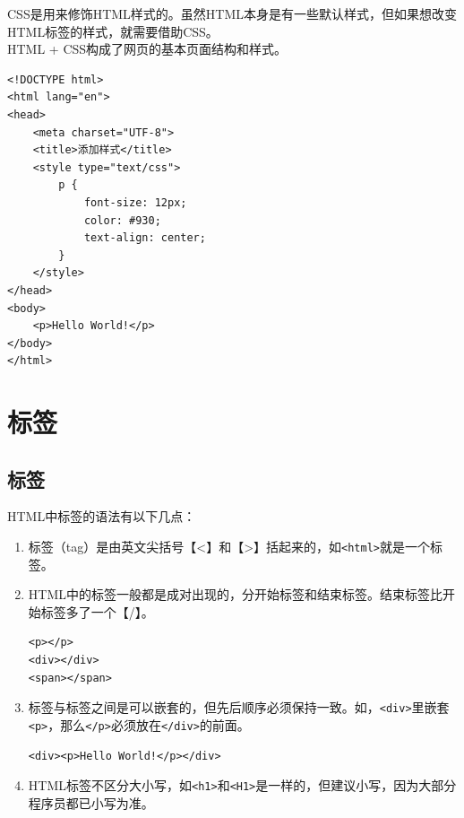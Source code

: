 CSS是用来修饰HTML样式的。虽然HTML本身是有一些默认样式，但如果想改变HTML标签的样式，就需要借助CSS。 \\

HTML + CSS构成了网页的基本页面结构和样式。

\begin{lstlisting}[style=htmlcssjs, title=添加样式]
<!DOCTYPE html>
<html lang="en">
<head>
    <meta charset="UTF-8">
    <title>添加样式</title>
    <style type="text/css">
        p {
            font-size: 12px;
            color: #930;
            text-align: center;
        }
    </style>
</head>
<body>
    <p>Hello World!</p>
</body>
</html>
\end{lstlisting}

\newpage

\section{标签}

\subsection{标签}

HTML中标签的语法有以下几点：

\begin{enumerate}
	\item 标签（tag）是由英文尖括号【<】和【>】括起来的，如\lstinline|<html>|就是一个标签。

	\item HTML中的标签一般都是成对出现的，分开始标签和结束标签。结束标签比开始标签多了一个【/】。
	      \begin{lstlisting}[style=htmlcssjs]
<p></p>
<div></div>
<span></span>
    \end{lstlisting}

	\item 标签与标签之间是可以嵌套的，但先后顺序必须保持一致。如，\lstinline|<div>|里嵌套\lstinline|<p>|，那么\lstinline|</p>|必须放在\lstinline|</div>|的前面。
	      \begin{lstlisting}[style=htmlcssjs]
<div><p>Hello World!</p></div>
    \end{lstlisting}

	\item HTML标签不区分大小写，如\lstinline|<h1>|和\lstinline|<H1>|是一样的，但建议小写，因为大部分程序员都已小写为准。
\end{enumerate}

\newpage

